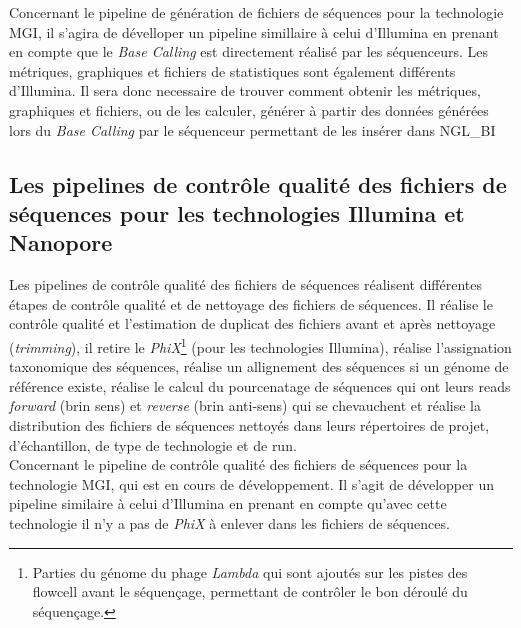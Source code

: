 Concernant le pipeline de génération de fichiers de séquences pour la technologie MGI, il s'agira de dévelloper un pipeline simillaire à celui d'Illumina en prenant en compte que le \emph{Base Calling} est directement réalisé par les séquenceurs. Les métriques, graphiques et fichiers de statistiques sont également différents d'Illumina. Il sera donc necessaire de trouver comment obtenir les métriques, graphiques et fichiers, ou de les calculer, générer à partir des données générées lors du \emph{Base Calling} par le séquenceur permettant de les insérer dans NGL\_BI

\subsection{Les pipelines de contrôle qualité des fichiers de séquences pour les technologies Illumina et Nanopore}
Les pipelines de contrôle qualité des fichiers de séquences réalisent différentes étapes de contrôle qualité et de nettoyage des fichiers de séquences. Il réalise le contrôle qualité et l'estimation de duplicat des fichiers avant et après nettoyage (\emph{trimming}), il retire le \emph{PhiX}\footnote{Parties du génome du phage \emph{Lambda} qui sont ajoutés sur les pistes des flowcell avant le séquençage, permettant de contrôler le bon déroulé du séquençage.} (pour les technologies Illumina), réalise l'assignation taxonomique des séquences, réalise un allignement des séquences si un génome de référence existe, réalise le calcul du pourcenatage de séquences qui ont leurs reads \emph{forward} (brin sens) et \emph{reverse} (brin anti-sens) qui se chevauchent et réalise la distribution des fichiers de séquences nettoyés dans leurs répertoires de projet, d'échantillon, de type de technologie et de run.\\

Concernant le pipeline de contrôle qualité des fichiers de séquences pour la technologie MGI, qui est en cours de développement. Il s'agit de développer un pipeline similaire à celui d'Illumina en prenant en compte qu'avec cette technologie il n'y a pas de \emph{PhiX} à enlever dans les fichiers de séquences.